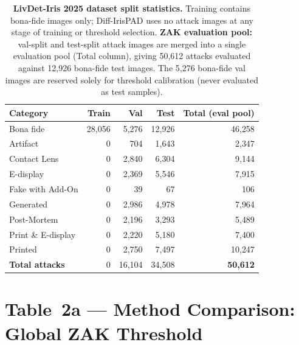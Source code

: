 \documentclass{article}
\begin{document}
\begin{table}[h!]
\centering
\setlength{\tabcolsep}{6pt}
\caption{%
  \textbf{LivDet-Iris 2025 dataset split statistics.}
  Training contains bona-fide images only; Diff-IrisPAD uses no attack images
  at any stage of training or threshold selection.
  \textbf{ZAK evaluation pool:} val-split and test-split attack images are
  merged into a single evaluation pool (Total column), giving
  50{,}612 attacks evaluated against 12{,}926 bona-fide test images.
  The 5{,}276 bona-fide val images are reserved solely for threshold
  calibration (never evaluated as test samples).}
\label{tab:dataset}
\begin{tabular}{lrrrr}
\toprule
\textbf{Category} & \textbf{Train} & \textbf{Val} & \textbf{Test} & \textbf{Total (eval pool)} \\
\midrule
Bona fide         & 28{,}056 & 5{,}276 & 12{,}926 & 46{,}258 \\
\midrule
Artifact          & 0 & 704   & 1{,}643  & 2{,}347  \\
Contact Lens      & 0 & 2{,}840 & 6{,}304 & 9{,}144  \\
E-display         & 0 & 2{,}369 & 5{,}546 & 7{,}915  \\
Fake with Add-On  & 0 & 39    & 67       & 106      \\
Generated         & 0 & 2{,}986 & 4{,}978 & 7{,}964  \\
Post-Mortem       & 0 & 2{,}196 & 3{,}293 & 5{,}489  \\
Print \& E-display& 0 & 2{,}220 & 5{,}180 & 7{,}400  \\
Printed           & 0 & 2{,}750 & 7{,}497 & 10{,}247 \\
\midrule
\textbf{Total attacks} & 0 & 16{,}104 & 34{,}508 & \textbf{50{,}612} \\
\bottomrule
\end{tabular}
\end{table}


\section*{Table~2a — Method Comparison: Global ZAK Threshold}
\end{document}
